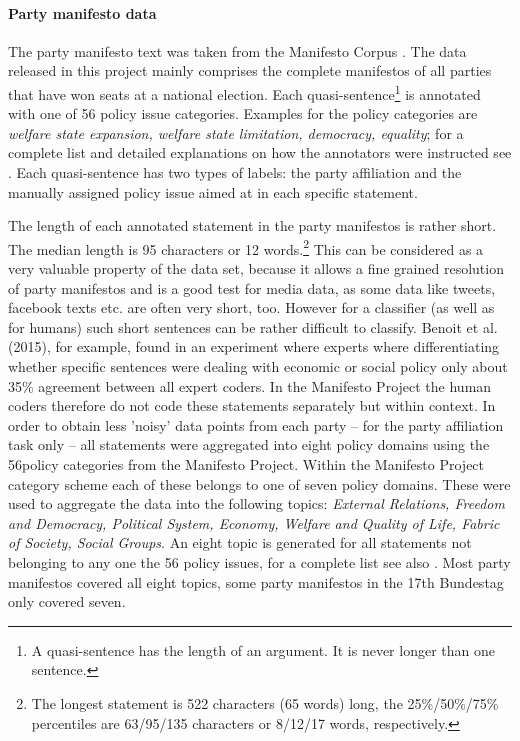 \documentclass[11pt]{article}
\begin{document}
\paragraph{Party manifesto data}
The party manifesto text was taken from the Manifesto Corpus  \cite{manifesto}. The data released in this project mainly comprises the complete manifestos of all parties that have won seats at a national election. Each quasi-sentence\footnote{A quasi-sentence has the length of an argument. It is never longer than one sentence.} is annotated with one of 56 policy issue categories. Examples for the policy categories are {\em welfare state expansion, welfare state limitation, democracy, equality}; for a complete list and detailed explanations on how the annotators were instructed see \cite{leftright}. Each quasi-sentence has  two types of labels: the party affiliation and the manually assigned policy issue aimed at in each specific statement. 


The length of each annotated statement in the party manifestos is rather short. The median length is 95 characters or 12 words.\footnote{The longest statement is 522 characters (65 words) long, the 25\%/50\%/75\% percentiles are 63/95/135 characters or 8/12/17 words, respectively.} This can be considered as a very valuable property of the data set, because it allows a fine grained resolution of party manifestos and is a good test for media data, as some data like tweets, facebook texts etc. are often very short, too. However for a classifier (as well as for humans) such short sentences can be rather difficult to classify. Benoit et al. (2015), for example, found in an experiment where experts where differentiating whether specific sentences were dealing with economic or social policy only about 35\% agreement between all expert coders. In the Manifesto Project the human coders therefore do not code these statements separately but within context. In order to obtain less 'noisy' data points from each party -- for the party affiliation task only -- all statements were aggregated into eight policy domains using the 56policy categories from the Manifesto Project. Within the Manifesto Project category scheme each of these belongs to one of seven policy domains. These were used to aggregate the data into the following topics: {\em External Relations, Freedom and Democracy, Political System, Economy, Welfare and Quality of Life, Fabric of Society, Social Groups}. An eight topic is generated for all statements not belonging to any one the 56 policy issues, for a complete list see also \cite{leftright}. Most party manifestos covered all eight topics, some party manifestos in the 17th Bundestag only covered seven.
\end{document}
